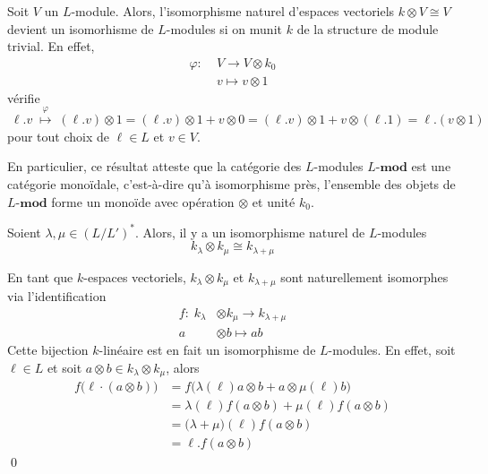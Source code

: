 \begin{Rem} Soit $V$ un $L$-module. Alors, l'isomorphisme naturel d'espaces vectoriels $k \otimes V \cong V$ devient un isomorhisme de $L$-modules si on munit $k$ de la structure de module trivial. En effet,
\begin{align*}
\varphi: \; &V \rightarrow V \otimes k_0\\
&v \longmapsto v \otimes 1
\end{align*}
vérifie $\; \ell.v \; \stackrel{\varphi}{\longmapsto} \; (\ell.v) \otimes 1 = (\ell.v) \otimes 1 + v \otimes 0 = (\ell.v) \otimes 1 + v \otimes (\ell.1) = \ell.(v \otimes 1) \;$ pour tout choix de $\ell \in L$ et $v \in V$.

En particulier, ce résultat atteste que la catégorie des $L$-modules $L$-$\mathbf{mod}$ est une catégorie monoïdale, c'est-à-dire qu'à isomorphisme près, l'ensemble des objets de $L$-$\mathbf{mod}$ forme un monoïde avec opération $\otimes$ et unité $k_0$. 
\end{Rem}


\begin{Lem} Soient $\lambda, \mu \in (L/L')^*$. Alors, il y a un isomorphisme naturel de $L$-modules
\begin{equation} \label{produitdimension1}
k_\lambda \otimes k_\mu \cong k_{\lambda + \mu}
\end{equation}
\begin{pre} En tant que $k$-espaces vectoriels, $k_\lambda \otimes k_\mu$ et $k_{\lambda + \mu}$ sont naturellement isomorphes via l'identification
\begin{align*}
f : \; k_\lambda &\otimes k_\mu \rightarrow k_{\lambda + \mu}\\
a &\otimes b  \longmapsto ab
\end{align*}
Cette bijection $k$-linéaire est en fait un isomorphisme de $L$-modules. En effet, soit $\ell \in L$ et soit $a \otimes b \in k_\lambda \otimes k_\mu$, alors
\begin{align*}
f\big(\ell \cdot (a \otimes b)\big) &= f\big(\lambda(\ell)a \otimes b + a \otimes \mu(\ell)b\big)\\
&= \lambda(\ell)f(a \otimes b) + \mu(\ell) f(a \otimes b)\\
&= \big(\lambda+\mu\big)(\ell)f(a \otimes b)\\
&= \ell. f(a \otimes b)
\end{align*}
\qed
\end{pre}
\end{Lem}

